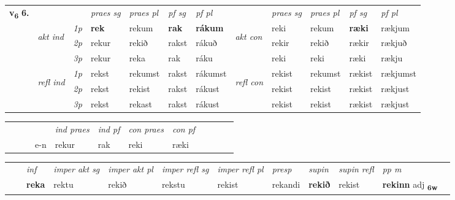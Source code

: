 \begin{tabular}{llllllllllll} \toprule
\multirow{4}{*}{{{\textbf{v{\textsubscript{6}}} \Large{\textbf{6.}}}}}  & &   &  \textit{praes sg}  & \textit{praes pl}  &\textit{ pf sg} & \textit{pf pl} &  &  \textit{praes sg}  & \textit{praes pl}  & \textit{pf sg} & \textit{pf pl } \\*
	\cmidrule{4-7} \cmidrule{9-12}
 & \multirow{3}{*}{\begin{turn}{90}\textit{akt ind}\end{turn}} & {\textit{1p}} & \textbf{rek} & rekum    & \textbf{rak} & \textbf{rákum} & \multirow{3}{*}{\begin{turn}{90}\textit{akt con}\end{turn}} &reki & rekum & \textbf{ræki} & rækjum\\*
& &  {\textit{2p}} &  rekur  & rekið   & rakst & rákuð & & rekir & rekið & rækir & rækjuð \\*
& &  {\textit{3p}} & rekur & reka   & rak & ráku & & reki & reki& ræki & rækju  \\*
\cmidrule{4-7} \cmidrule{9-12}
 &\multirow{3}{*}{\begin{turn}{90}\textit{refl ind}\end{turn}} & {\textit{1p}} & rekst & rekumst    & rakst & rákumst & \multirow{3}{*}{\begin{turn}{90}\textit{refl con}\end{turn}}  &rekist & rekumst & rækist & rækjumst\\*
 &&  {\textit{2p}} &  rekst  & rekist   & rakst & rákust & &rekist & rekist & rækist & rækjust \\*
& &  {\textit{3p}} & rekst & rekast   & rakst & rákust & & rekist & rekist& rækist & rækjust  \\*
\cmidrule{4-7} \cmidrule{9-12}
\end{tabular}


\begin{tabular}{llllllllllll}
 & &  & &  \textit{ind praes} & \textit{ind pf} & \textit{con praes} & \textit{con pf} \\*
&  & & e-n & rekur & rak & reki & ræki \\*
\cmidrule{5-9}
\end{tabular}


\begin{tabular}{llllllllllll}
 & & \textit{inf} & \textit{imper akt sg} & \textit{imper akt pl} & \textit{imper refl sg} & \textit{imper refl pl} & \textit{presp} & \textit{supin} & \textit{supin refl} & \textit{pp m}     \\*
  & & \textbf{reka} & rektu  & rekið & rekstu & rekist & rekandi &  \textbf{rekið} & rekist & \textbf{rekinn} adj \textbf{\textsubscript{6w}} \\*
\cmidrule{1-12}
\end{tabular}



